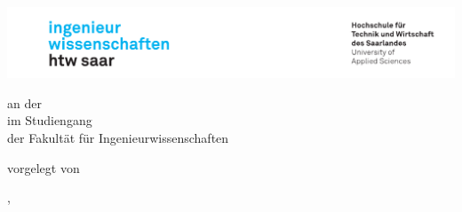 \begin{titlepage}\linespread{1.5}\selectfont
\includegraphics[width=\linewidth]{Graphics/htwsaar_Logo_inwi_head_VF_4C_crop}
  \begin{center}
    \large  
    \hfill
    \vfill
    \begingroup
      \Large\bfseries\myDegreeType 
    \endgroup
		
		\bigskip
		
     
    an der \myUni \\
    im Studiengang \myDegreeCourse \\
    der Fakultät für Ingenieurwissenschaften \\ 
    
  \vfill
	
  \begingroup
   
  \endgroup
	
	\bigskip
	
  vorgelegt von \\
  \myName
	
  \vfill
	
 
	
  \vfill
	
  \myLocation, \myTime                   

    \end{center}       
\end{titlepage}   